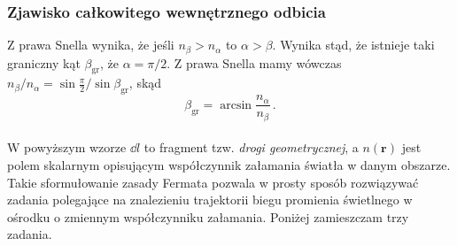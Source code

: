 \documentclass[../main.tex]{subfiles}
\begin{document}
\subsubsection*{Zjawisko całkowitego wewnętrznego odbicia}
 Z prawa Snella wynika, że jeśli \(n_\beta>n_\alpha\) to \(\alpha>\beta\). Wynika stąd, że istnieje
 taki graniczny kąt \(\beta_\text{gr}\), że \(\alpha=\pi/2\). Z prawa Snella mamy wówczas
 \(n_\beta/n_\alpha=\sin \frac{\pi}{2}/\sin\beta_\text{gr}\), skąd
\begin{equation*}
    \beta_\text{gr}=\arcsin\frac{n_\alpha}{n_\beta}\,.
\end{equation*}
\noindent{}\\

W powyższym wzorze \(\dd{l}\) to fragment tzw. \textit{drogi geometrycznej}, a \(n(\mathbf{r})\)
jest polem skalarnym opisującym współczynnik załamania światła w danym obszarze. Takie sformułowanie
zasady Fermata pozwala w prosty sposób rozwiązywać zadania polegające na znalezieniu trajektorii
biegu promienia świetlnego w ośrodku o zmiennym współczynniku załamania. Poniżej zamieszczam trzy
zadania.
\medskip
\end{document}
